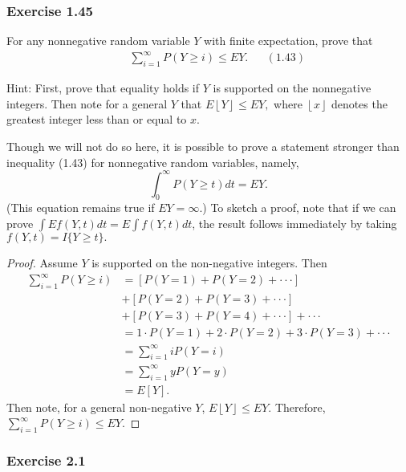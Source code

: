 \documentclass[12pt,]{article}
\begin{document}
\hypertarget{exercise-1.45}{%
\subsubsection{Exercise 1.45}\label{exercise-1.45}}

For any nonnegative random variable \(Y\) with finite expectation, prove
that \begin{align*}
&& \sum_{i=1}^{\infty} P(Y\ge i) \le EY. && (1.43)
\end{align*}

Hint: First, prove that equality holds if \(Y\) is supported on the
nonnegative integers. Then note for a general \(Y\) that
\(E{\left\lfloor Y \right\rfloor} \le EY,\) where
\({\left\lfloor x \right\rfloor}\) denotes the greatest integer less
than or equal to \(x.\)

Though we will not do so here, it is possible to prove a statement
stronger than inequality (1.43) for nonnegative random variables,
namely, \[\int_0^\infty P(Y\ge t)dt = EY.\] (This equation remains true
if \(EY = \infty\).) To sketch a proof, note that if we can prove
\(\int E f(Y,t)dt = E\int f(Y,t)dt\), the result follows immediately by
taking \(f(Y,t) = I\{Y\ge t\}.\)

\begin{proof}
Assume $Y$ is supported on the non-negative integers. Then 
\begin{align*}
\sum_{i =1}^{\infty}P(Y\ge i) & = [P(Y=1)+P(Y=2)+\cdot \cdot \cdot]\\
& +[P(Y=2)+P(Y=3)+\cdot \cdot \cdot]\\
& + [P(Y=3)+P(Y=4)+\cdot \cdot \cdot] + \cdot \cdot \cdot\\
& = 1\cdot P(Y = 1) + 2\cdot P(Y=2) + 3\cdot P(Y=3) + \cdot \cdot \cdot\\
& = \sum_{i=1}^\infty i P(Y = i)\\
& = \sum_{i=1}^\infty y P(Y = y)\\
& = E[Y].
\end{align*}
Then note, for a general non-negative $Y$, $E{\left\lfloor Y \right\rfloor} \le EY.$ Therefore, $\sum_{i=1}^{\infty} P(Y\ge i) \le EY.$ 

\end{proof}

\hypertarget{exercise-2.1}{%
\subsubsection{Exercise 2.1}\label{exercise-2.1}}
\end{document}
